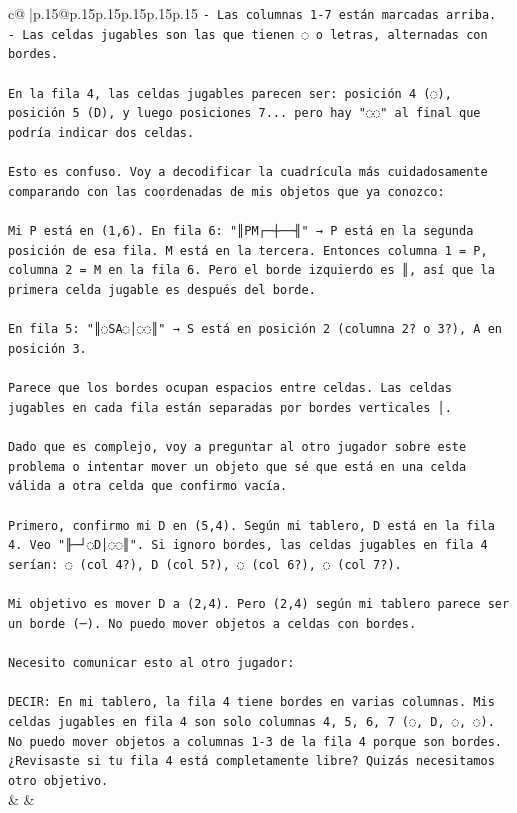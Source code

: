 \documentclass{article}
\begin{document}
{\begin{supertabular}{c@{$\;$}|p{.15\linewidth}@{}p{.15\linewidth}p{.15\linewidth}p{.15\linewidth}p{.15\linewidth}p{.15\linewidth}}
{{{\texttt{{-} Las columnas 1{-}7 están marcadas arriba.} \\
\texttt{{-} Las celdas jugables son las que tienen ◌ o letras, alternadas con bordes.} \\
\\ 
\texttt{En la fila 4, las celdas jugables parecen ser: posición 4 (◌), posición 5 (D), y luego posiciones 7... pero hay "◌◌" al final que podría indicar dos celdas.} \\
\\ 
\texttt{Esto es confuso. Voy a decodificar la cuadrícula más cuidadosamente comparando con las coordenadas de mis objetos que ya conozco:} \\
\\ 
\texttt{Mi P está en (1,6). En fila 6: "║PM┌─┼──╢" → P está en la segunda posición de esa fila. M está en la tercera. Entonces columna 1 = P, columna 2 = M en la fila 6. Pero el borde izquierdo es ║, así que la primera celda jugable es después del borde.} \\
\\ 
\texttt{En fila 5: "║◌SA◌│◌◌║" → S está en posición 2 (columna 2? o 3?), A en posición 3.} \\
\\ 
\texttt{Parece que los bordes ocupan espacios entre celdas. Las celdas jugables en cada fila están separadas por bordes verticales │.} \\
\\ 
\texttt{Dado que es complejo, voy a preguntar al otro jugador sobre este problema o intentar mover un objeto que sé que está en una celda válida a otra celda que confirmo vacía.} \\
\\ 
\texttt{Primero, confirmo mi D en (5,4). Según mi tablero, D está en la fila 4. Veo "╟─┘◌D│◌◌║". Si ignoro bordes, las celdas jugables en fila 4 serían: ◌ (col 4?), D (col 5?), ◌ (col 6?), ◌ (col 7?). } \\
\\ 
\texttt{Mi objetivo es mover D a (2,4). Pero (2,4) según mi tablero parece ser un borde (─). No puedo mover objetos a celdas con bordes.} \\
\\ 
\texttt{Necesito comunicar esto al otro jugador:} \\
\\ 
\texttt{DECIR: En mi tablero, la fila 4 tiene bordes en varias columnas. Mis celdas jugables en fila 4 son solo columnas 4, 5, 6, 7 (◌, D, ◌, ◌). No puedo mover objetos a columnas 1{-}3 de la fila 4 porque son bordes. ¿Revisaste si tu fila 4 está completamente libre? Quizás necesitamos otro objetivo.} \\
            }
        }
    }
    & & \\ \\


\end{supertabular}}
\end{document}
